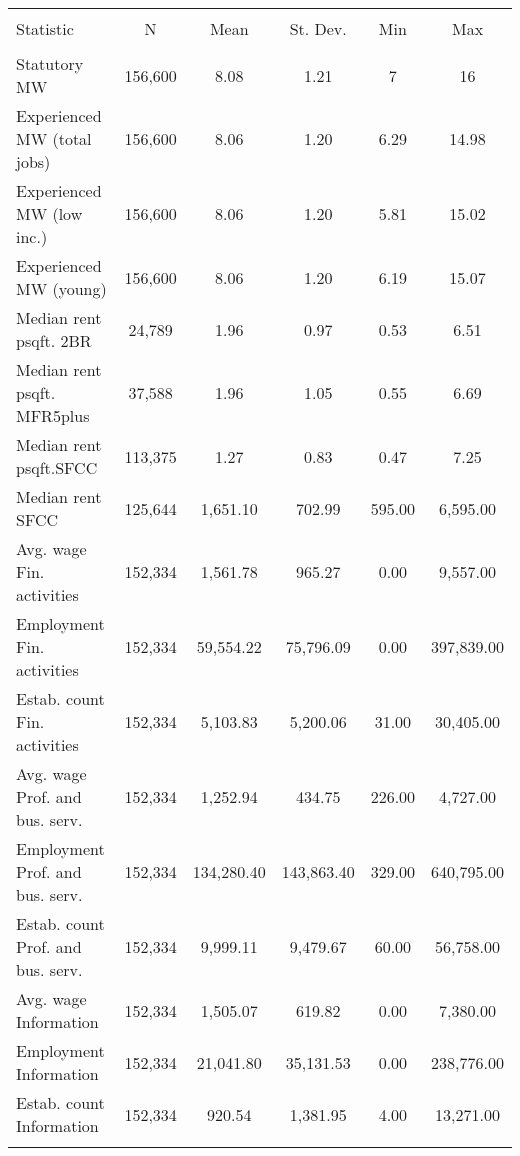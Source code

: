 
\begin{tabular}{@{\extracolsep{5pt}}lccccc} 
\\[-1.8ex]\hline 
\hline \\[-1.8ex] 
Statistic & \multicolumn{1}{c}{N} & \multicolumn{1}{c}{Mean} & \multicolumn{1}{c}{St. Dev.} & \multicolumn{1}{c}{Min} & \multicolumn{1}{c}{Max} \\ 
\hline \\[-1.8ex] 
Statutory MW & 156,600 & 8.08 & 1.21 & 7 & 16 \\ 
Experienced MW (total jobs) & 156,600 & 8.06 & 1.20 & 6.29 & 14.98 \\ 
Experienced MW (low inc.) & 156,600 & 8.06 & 1.20 & 5.81 & 15.02 \\ 
Experienced MW (young) & 156,600 & 8.06 & 1.20 & 6.19 & 15.07 \\ 
Median rent psqft. 2BR & 24,789 & 1.96 & 0.97 & 0.53 & 6.51 \\ 
Median rent psqft. MFR5plus & 37,588 & 1.96 & 1.05 & 0.55 & 6.69 \\ 
Median rent psqft.SFCC & 113,375 & 1.27 & 0.83 & 0.47 & 7.25 \\ 
Median rent SFCC & 125,644 & 1,651.10 & 702.99 & 595.00 & 6,595.00 \\ 
Avg. wage Fin. activities & 152,334 & 1,561.78 & 965.27 & 0.00 & 9,557.00 \\ 
Employment Fin. activities & 152,334 & 59,554.22 & 75,796.09 & 0.00 & 397,839.00 \\ 
Estab. count Fin. activities & 152,334 & 5,103.83 & 5,200.06 & 31.00 & 30,405.00 \\ 
Avg. wage Prof. and bus. serv. & 152,334 & 1,252.94 & 434.75 & 226.00 & 4,727.00 \\ 
Employment Prof. and bus. serv. & 152,334 & 134,280.40 & 143,863.40 & 329.00 & 640,795.00 \\ 
Estab. count Prof. and bus. serv. & 152,334 & 9,999.11 & 9,479.67 & 60.00 & 56,758.00 \\ 
Avg. wage Information & 152,334 & 1,505.07 & 619.82 & 0.00 & 7,380.00 \\ 
Employment Information & 152,334 & 21,041.80 & 35,131.53 & 0.00 & 238,776.00 \\ 
Estab. count Information & 152,334 & 920.54 & 1,381.95 & 4.00 & 13,271.00 \\ 
\hline \\[-1.8ex] 
\end{tabular} 
